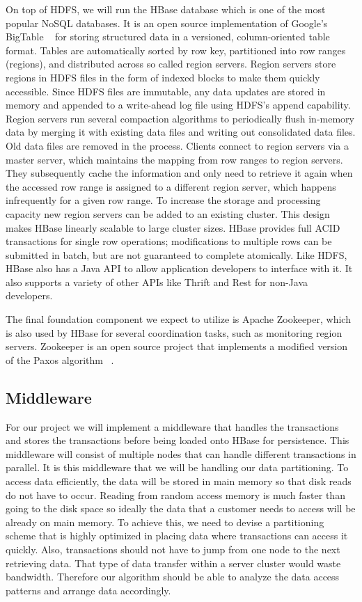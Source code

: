 \documentclass[10pt,final,journal]{IEEEtran}
\begin{document}
On top of HDFS, we will run the HBase database which is one of the most popular NoSQL databases. It is an open source implementation of Google's BigTable ~\cite{Chang:2006:BDS:1267308.1267323} for storing structured data in a versioned, column-oriented table format. Tables are automatically sorted by row key, partitioned into row ranges (regions), and distributed across so called region servers. Region servers store regions in HDFS files in the form of indexed blocks to make them quickly accessible. Since HDFS files are immutable, any data updates are stored in memory and appended to a write-ahead log file using HDFS's append capability. Region servers run several compaction algorithms to periodically flush in-memory data by merging it with existing data files and writing out consolidated data files. Old data files are removed in the process. Clients connect to region servers via a master server, which maintains the mapping from row ranges to region servers. They subsequently cache the information and only need to retrieve it again when the accessed row range is assigned to a different region server, which happens infrequently for a given row range. To increase the storage and processing capacity new region servers can be added to an existing cluster. This design makes HBase linearly scalable to large cluster sizes. HBase provides full ACID transactions for single row operations; modifications to multiple rows can be submitted in batch, but are not guaranteed to complete atomically. Like HDFS, HBase also has a Java API to allow application developers to interface with it.  It also supports a variety of other APIs like Thrift and Rest for non-Java developers.

The final foundation component we expect to utilize is Apache Zookeeper, which is also used by HBase for several coordination tasks, such as monitoring region servers. Zookeeper is an open source project that implements a modified version of the Paxos algorithm ~\cite{}.



\subsection{Middleware}
For our project we will implement a middleware that handles the transactions and stores the transactions before being loaded onto HBase for persistence.  This middleware will consist of multiple nodes that can handle different transactions in parallel.  It is this middleware that we will be handling our data partitioning.  To access data efficiently, the data will be stored in main memory so that disk reads do not have to occur.  Reading from random access memory is much faster than going to the disk space so ideally the data that a customer needs to access will be already on main memory.  To achieve this, we need to devise a partitioning scheme that is highly optimized in placing data where transactions can access it quickly.  Also, transactions should not have to jump from one node to the next retrieving data.  That type of data transfer within a server cluster would waste bandwidth.  Therefore our algorithm should be able to analyze the data access patterns and arrange data accordingly.
\end{document}
